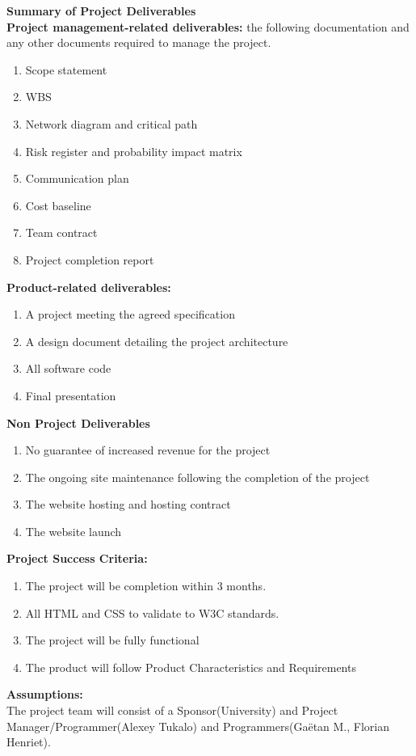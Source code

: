 \documentclass[english]{article}
\begin{document}
  \begin{framed}
  \textbf{Summary of Project Deliverables}\\
  
 \textbf{Project management-related deliverables: }the following documentation and any other documents required to manage the project.
 \begin{enumerate}
  \item  Scope statement
  \item WBS
  \item Network diagram and critical path
  \item Risk register and probability impact matrix
  \item Communication plan
  \item Cost baseline
  \item Team contract
  \item Project completion report
	\end{enumerate}


 \textbf{Product-related deliverables:}
  \begin{enumerate}
  \item A project meeting the agreed specification
  \item A design document detailing the project architecture
  \item All software code
  \item Final presentation
	\end{enumerate}


\textbf{Non Project Deliverables}
  \begin{enumerate}
  \item No guarantee of increased revenue for the project
  \item The ongoing site maintenance following the completion of the project
  \item The website hosting and hosting contract
  \item The website launch
	\end{enumerate}
  \end{framed}
  \begin{framed}
  \textbf{Project Success Criteria:} \\
   \begin{enumerate}
  \item The project will be completion within 3 months.
  \item All HTML and CSS to validate to W3C standards.
  \item The project will be fully functional
  \item The product will follow Product Characteristics and Requirements
	\end{enumerate}
  \end{framed}
  \begin{framed}
\textbf{Assumptions:} \\

The project team will consist of a Sponsor(University) and Project Manager/Programmer(Alexey Tukalo) and Programmers(Gaëtan M., Florian Henriet).
\end{framed}
\end{document}
